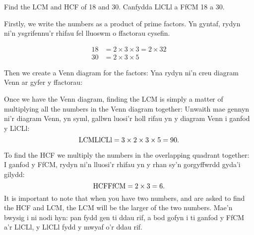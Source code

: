 \begin{example}
Find the LCM and HCF of 18 and 30.
Canfydda LlCLl a FfCM 18 a 30.

\begin{solution}

Firstly, we write the numbers as a product of prime factors.
Yn gyntaf, rydyn ni'n ysgrifennu'r rhifau fel lluoswm o ffactorau cysefin.

\begin{align*}
18 	& = 2 \times 3 \times 3 = 2 \times 32 \\
30	& = 2 \times 3 \times 5
\end{align*}

Then we create a Venn diagram for the factors:
Yna rydyn ni'n creu diagram Venn ar gyfer y ffactorau:

\begin{figure}[H]
\centering
{}
\end{figure}

\en
Once we have the Venn diagram, finding the LCM is simply a matter of multiplying all the numbers in the Venn diagram together:
\cy
Unwaith mae gennyn ni'r diagram Venn, yn syml, gallwn luosi'r holl rifau yn y diagram Venn i ganfod y LlCLl:
\bi
\[
\text{{LCM}{LlCLl}} = 3 \times 2 \times 3 \times 5 = 90.
\]

\en To find the HCF we multiply the numbers in the overlapping quadrant together:
\cy I ganfod y FfCM, rydyn ni'n lluosi'r rhifau yn y rhan sy'n gorgyffwrdd gyda'i gilydd:
\bi
\[
\text{{HCF}{FfCM}} = 2 \times 3 = 6.
\]
\en
It is important to note that when you have two numbers, and are asked to find the HCF and LCM, the LCM will be the larger of the two numbers.
\cy
Mae'n bwysig i ni nodi hyn: pan fydd gen ti ddau rif, a bod gofyn i ti ganfod y FfCM a'r LlCLl, y LlCLl fydd y mwyaf o'r ddau rif.

\end{solution}
\end{example}

